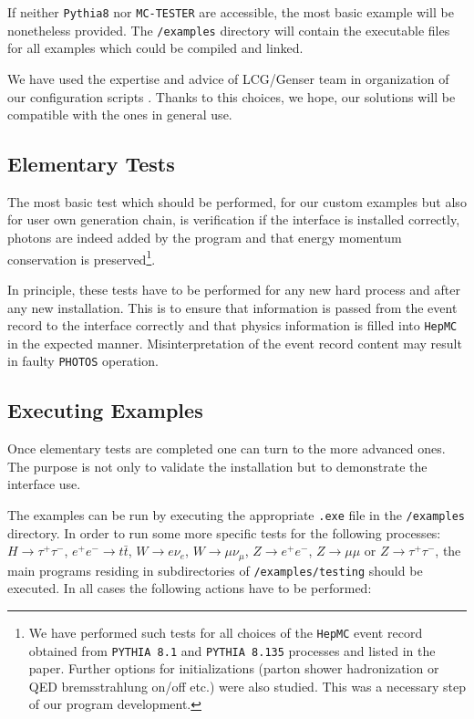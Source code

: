 \documentclass[]{Photos_interface_design}
\begin{document}
If neither {\tt Pythia8} nor {\tt MC-TESTER} are accessible,  the most basic
 example will be nonetheless provided. The {\tt /examples} directory will 
contain the executable files for all examples which could be compiled and 
linked.

We have used the expertise and advice 
of LCG/Genser team  in organization of our configuration scripts 
 \cite{Kirsanov:2008zz}.  Thanks to this choices, we hope, our solutions
 will be compatible with the ones in general use.

\subsection{Elementary Tests}
\label{sect:elem}

The most basic test which should be performed, for our custom examples but also for  user own generation chain, 
 is verification if the interface is installed correctly, 
photons are indeed added by the program and that energy momentum 
conservation is preserved\footnote{
We have  performed such  tests for all choices of the {\tt HepMC} event record obtained 
from  {\tt PYTHIA 8.1} and {\tt PYTHIA 8.135} processes and 
listed in the paper. Further  options for initializations 
(parton shower hadronization or QED bremsstrahlung on/off etc.) were also studied.
This was a necessary step of our program development.}.

In principle, these tests have to be performed for any new hard 
process and after any new installation. This is to ensure that 
information is passed from the event record to the interface 
correctly and that physics information is filled into {\tt HepMC} 
in the expected manner. Misinterpretation of the event record content may result in 
faulty {\tt PHOTOS} operation.


\subsection{Executing Examples}

Once elementary tests are completed one can turn to the more advanced ones.
The purpose is not only to validate the installation but to demonstrate the
interface use.

The examples can be run by executing the appropriate {\tt .exe} file in the {\tt /examples} directory.
In order to run some more specific tests for the following processes:
$H \rightarrow \tau^+ \tau^-$, $ e^+ e^- \rightarrow t \bar t$,
$W \rightarrow e \nu_e$, $W \rightarrow \mu \nu_\mu$,
$Z \rightarrow e^+ e^-$, $Z \rightarrow \mu \mu$ or $Z \rightarrow \tau^+ \tau^-$,
the main programs residing in subdirectories of {\tt /examples/testing} should be executed.
In all cases the following actions have to be performed:
\end{document}
